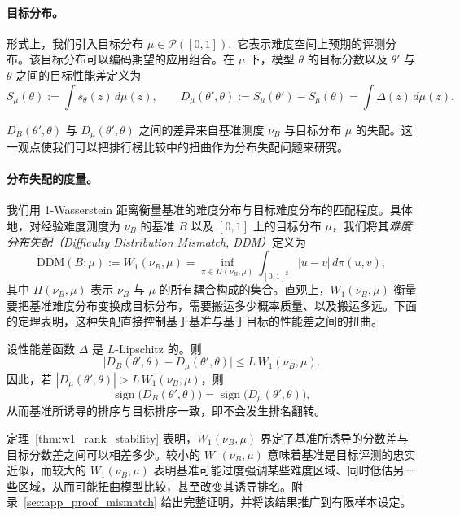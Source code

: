 \paragraph{目标分布。}
形式上，我们引入目标分布
$
\mu \in \mathcal{P}([0,1]),
$
它表示难度空间上预期的评测分布。该目标分布可以编码期望的应用组合。在 $\mu$ 下，模型 $\theta$ 的目标分数以及 $\theta'$ 与 $\theta$ 之间的目标性能差定义为
\[
S_\mu(\theta)
:=
\int s_\theta(z)\, d\mu(z),
\qquad
D_\mu(\theta',\theta)
:=
S_\mu(\theta') - S_\mu(\theta)
=
\int \Delta(z)\, d\mu(z).
\]

$D_B(\theta',\theta)$ 与 $D_\mu(\theta',\theta)$ 之间的差异来自基准测度 $\nu_B$ 与目标分布 $\mu$ 的失配。这一观点使我们可以把排行榜比较中的扭曲作为分布失配问题来研究。

\paragraph{分布失配的度量。}
我们用 1-Wasserstein 距离衡量基准的难度分布与目标难度分布的匹配程度。具体地，对经验难度测度为 $\nu_B$ 的基准 \(B\) 以及 \([0,1]\) 上的目标分布 \(\mu\)，我们将其\emph{难度分布失配（Difficulty Distribution Mismatch, DDM）}定义为
\[
\mathrm{DDM}(B;\mu) := W_1(\nu_B,\mu)
=
\inf_{\pi \in \Pi(\nu_B,\mu)}
\int_{[0,1]^2} |u-v|\, d\pi(u,v),
\]
其中 $\Pi(\nu_B,\mu)$ 表示 $\nu_B$ 与 $\mu$ 的所有耦合构成的集合。直观上，$W_1(\nu_B,\mu)$ 衡量要把基准难度分布变换成目标分布，需要搬运多少概率质量、以及搬运多远。下面的定理表明，这种失配直接控制基于基准与基于目标的性能差之间的扭曲。



\begin{theorem}[分布失配控制分数扭曲与排名稳定性]
\label{thm:w1_rank_stability}
设性能差函数 $\Delta$ 是 $L$-Lipschitz 的。则
\[
\bigl|D_B(\theta',\theta) - D_\mu(\theta',\theta)\bigr|
\le
L\, W_1(\nu_B,\mu).
\]
因此，若 $|D_\mu(\theta',\theta)| > L\, W_1(\nu_B,\mu)$，则
\[
\operatorname{sign}\bigl(D_B(\theta',\theta)\bigr)
=
\operatorname{sign}\bigl(D_\mu(\theta',\theta)\bigr),
\]
从而基准所诱导的排序与目标排序一致，即不会发生排名翻转。
\end{theorem}



定理~\ref{thm:w1_rank_stability} 表明，$W_1(\nu_B,\mu)$ 界定了基准所诱导的分数差与目标分数差之间可以相差多少。较小的 $W_1(\nu_B,\mu)$ 意味着基准是目标评测的忠实近似，而较大的 $W_1(\nu_B,\mu)$ 表明基准可能过度强调某些难度区域、同时低估另一些区域，从而可能扭曲模型比较，甚至改变其诱导排名。附录~\ref{sec:app_proof_mismatch} 给出完整证明，并将该结果推广到有限样本设定。



